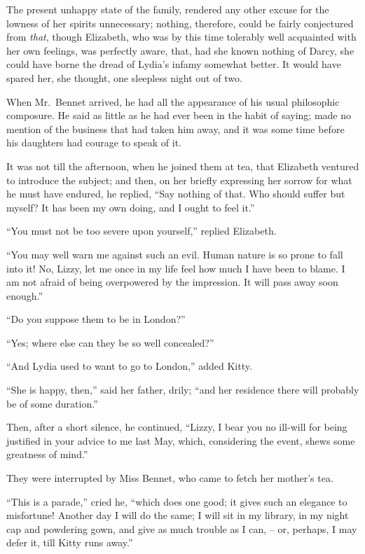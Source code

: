 The present unhappy state of the family, rendered any
other excuse for the lowness of her spirits unnecessary;
nothing, therefore, could be fairly conjectured from \textit{that},
though Elizabeth, who was by this time tolerably well
acquainted with her own feelings, was perfectly aware,
that, had she known nothing of Darcy, she could have
borne the dread of Lydia’s infamy somewhat better. It
would have spared her, she thought, one sleepless night
out of two.

When Mr.\ Bennet arrived, he had all the appearance
of his usual philosophic composure. He said as little as
he had ever been in the habit of saying; made no mention
of the business that had taken him away, and it was
some time before his daughters had courage to speak of it.

It was not till the afternoon, when he joined them at
tea, that Elizabeth ventured to introduce the subject;
and then, on her briefly expressing her sorrow for what
he must have endured, he replied, “Say nothing of that.
Who should suffer but myself? It has been my own
doing, and I ought to feel it.”

“You must not be too severe upon yourself,” replied
Elizabeth.

“You may well warn me against such an evil. Human
nature is so prone to fall into it! No, Lizzy, let me once
in my life feel how much I have been to blame. I am not
afraid of being overpowered by the impression. It will
pass away soon enough.”

“Do you suppose them to be in London?”

“Yes; where else can they be so well concealed?”

“And Lydia used to want to go to London,” added
Kitty.

“She is happy, then,” said her father, drily; “and
her residence there will probably be of some duration.”

Then, after a short silence, he continued, “Lizzy, I bear
you no ill-will for being justified in your advice to me
last May, which, considering the event, shews some
greatness of mind.”

They were interrupted by Miss Bennet, who came to
fetch her mother’s tea.

“This is a parade,” cried he, “which does one good;
it gives such an elegance to misfortune! Another day
I will do the same; I will sit in my library, in my night cap
and powdering gown, and give as much trouble as I can, -- or,
perhaps, I may defer it, till Kitty runs away.”

